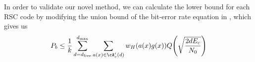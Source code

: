 

In order to validate our novel method, we can calculate the lower bound for each RSC code by modifying the union bound of the bit-error rate
equation in \cite{ref4}, which gives us 
\begin{align}
P_b \leq \frac{1}{k} \sum_{d=d_{\text{free}}}^{d_{\text{max}}} \sum_{a(x) \in \cA'_c(d)}w_H(a(x)g(x)) Q\Bigg( \sqrt{\frac{2dE_c}{N_0}}\Bigg)
\label{novelEq7}
\end{align}
\newpage